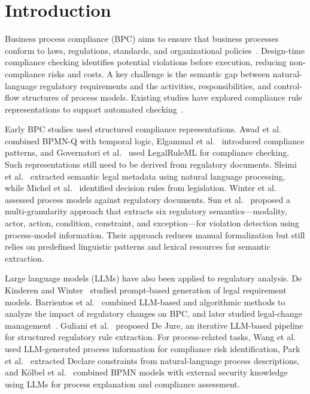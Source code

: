 \documentclass[conference]{IEEEtran}
\begin{document}
\section{Introduction}
\label{sec:1}

Business process compliance (BPC) aims to ensure that business processes conform to laws, regulations, standards, and organizational policies~\cite{hashmi2018we}. Design-time compliance checking identifies potential violations before execution, reducing non-compliance risks and costs. A key challenge is the semantic gap between natural-language regulatory requirements and the activities, responsibilities, and control-flow structures of process models. Existing studies have explored compliance rule representations to support automated checking~\cite{zasada2023evaluation}.

Early BPC studies used structured compliance representations. Awad et al.~\cite{awad2008efficient} combined BPMN-Q with temporal logic, Elgammal et al.~\cite{elgammal2016formalizing} introduced compliance patterns, and Governatori et al.~\cite{governatori2016semantic} used LegalRuleML for compliance checking. Such representations still need to be derived from regulatory documents. Sleimi et al.~\cite{sleimi2018automated} extracted semantic legal metadata using natural language processing, while Michel et al.~\cite{michel2022identification} identified decision rules from legislation. Winter et al.~\cite{winter2020assessing} assessed process models against regulatory documents. Sun et al.~\cite{sun2024design} proposed a multi-granularity approach that extracts six regulatory semantics---modality, actor, action, condition, constraint, and exception---for violation detection using process-model information. Their approach reduces manual formalization but still relies on predefined linguistic patterns and lexical resources for semantic extraction.

Large language models (LLMs) have also been applied to regulatory analysis. De Kinderen and Winter~\cite{de2024towards} studied prompt-based generation of legal requirement models. Barrientos et al.~\cite{barrientos2026impact} combined LLM-based and algorithmic methods to analyze the impact of regulatory changes on BPC, and later studied legal-change management~\cite{barrientos2026taming}. Guliani et al.~\cite{guliani2026dejure} proposed De Jure, an iterative LLM-based pipeline for structured regulatory rule extraction. For process-related tasks, Wang et al.~\cite{wang2025leveraging} used LLM-generated process information for compliance risk identification, Park et al.~\cite{park2026extracting} extracted Declare constraints from natural-language process descriptions, and K\"olbel et al.~\cite{koelbel2026context} combined BPMN models with external security knowledge using LLMs for process explanation and compliance assessment.
\end{document}

